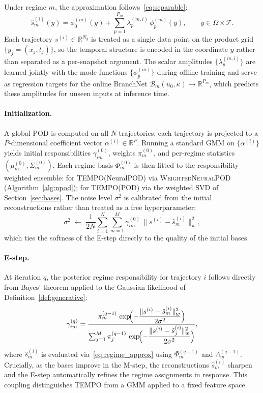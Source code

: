 \documentclass{article}
\begin{document}
Under regime $m$, the approximation follows~\eqref{eq:separable}:
\begin{equation}
  \hat{s}_m^{(i)}(y)
  = \phi_0^{(m)}(y)
  + \sum_{p=1}^{P_m}
    \lambda_p^{(m,i)}\,\phi_p^{(m)}(y),
  \qquad y\in\Omega\times\mathcal{T}.
  \label{eq:regime_approx}
\end{equation}
Each trajectory $s^{(i)}\in\mathbb{R}^{N_y}$ is treated as a single data point on
the product grid $\{y_j=(x_j,t_j)\}$, so the temporal structure is encoded in the
coordinate $y$ rather than separated as a per-snapshot argument.
The scalar amplitudes $\{\lambda_p^{(m,i)}\}$ are learned jointly with the mode
functions $\{\phi_p^{(m)}\}$ during offline training and serve as regression targets
for the online BranchNet $\mathcal{B}_m(u_0,\kappa)\to\mathbb{R}^{P_m}$,
which predicts these amplitudes for unseen inputs at inference time.

\paragraph{Initialization.}
A global POD is computed on all $N$ trajectories; each trajectory is
projected to a $P$-dimensional coefficient vector
$\alpha^{(i)} \in \mathbb{R}^P$.
Running a standard GMM on $\{\alpha^{(i)}\}$ yields initial
responsibilities $\gamma_{im}^{(0)}$, weights $\pi_m^{(0)}$,
and per-regime statistics $(\mu_m^{(0)}, \Sigma_m^{(0)})$.
Each regime basis $\Phi_m^{(0)}$ is then fitted to the
responsibility-weighted ensemble: for TEMPO(NeuralPOD) via
\textsc{WeightedNeuralPOD} (Algorithm~\ref{alg:npod}); for TEMPO(POD)
via the weighted SVD of Section~\ref{sec:bases}.
The noise level $\sigma^2$ is calibrated from the initial
reconstructions rather than treated as a free hyperparameter:
\begin{equation}
  \sigma^2 \;\leftarrow\;
  \frac{1}{2N}\sum_{i=1}^N\sum_{m=1}^M
  \gamma_{im}^{(0)}\,\bigl\|s^{(i)} - \hat{s}_m^{(i)}\bigr\|_w^2,
  \label{eq:sigma2_calib}
\end{equation}
which ties the softness of the E-step directly to the quality of the
initial bases.

\paragraph{E-step.}
At iteration $q$, the posterior regime responsibility for trajectory $i$
follows directly from Bayes' theorem applied to the Gaussian likelihood
of Definition~\ref{def:generative}:
\begin{equation}
  \gamma_{im}^{(q)}
  = \frac{
    \pi_m^{(q-1)}\,
    \exp\!\Bigl(-\dfrac{\|s^{(i)}-\hat{s}_m^{(i)}\|_w^2}{2\sigma^2}\Bigr)
  }{
    \sum_{j=1}^{M}
    \pi_j^{(q-1)}\,
    \exp\!\Bigl(-\dfrac{\|s^{(i)}-\hat{s}_j^{(i)}\|_w^2}{2\sigma^2}\Bigr)
  },
  \label{eq:estep}
\end{equation}
where $\hat{s}_m^{(i)}$ is evaluated via~\eqref{eq:regime_approx}
using $\Phi_m^{(q-1)}$ and $\Lambda_m^{(q-1)}$.
Crucially, as the bases improve in the M-step, the
reconstructions $\hat{s}_m^{(i)}$ sharpen and the E-step
automatically refines the regime assignments in response.
This coupling distinguishes TEMPO from a GMM applied to a fixed
feature space.
\end{document}
